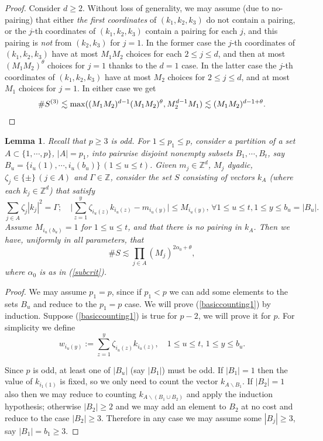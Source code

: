 \documentclass[11 pt,reqno]{amsart}
\newtheorem{lem}[thm]{Lemma}
\theoremstyle{definition}
\theoremstyle{remark}
\numberwithin{equation}{section}
\newcommand{\Zb}{\mathbb{Z}}
\begin{document}
{\begin{proof}
Consider $d\geq 2$. Without loss of generality, we may assume (due to no-pairing) that either \emph{the first coordinates} of $(k_1,k_2,k_3)$ do not contain a pairing, or the $j$-th coordinates of $(k_1,k_2,k_3)$ contain a pairing for each $j$, and this pairing is \emph{not} from $(k_2,k_3)$ for $j=1$. In the former case the $j$-th coordinates of $(k_1,k_2,k_3)$ have at most $M_1M_2$ choices for each $2\leq j\leq d$, and then at most $(M_1M_2)^\theta$ choices for $j=1$ thanks to the $d=1$ case. In the latter case the $j$-th coordinates of $(k_1,k_2,k_3)$ have at most $M_2$ choices for $2\leq j\leq d$, and at most $M_1$ choices for $j=1$. In either case we get
\[\#S^{(3)}\lesssim\max((M_1M_2)^{d-1}(M_1M_2)^\theta,M_2^{d-1}M_1)\lesssim (M_1M_2)^{d-1+\theta}.\qedhere\]
 \end{proof}
 \begin{lem}\label{basic} Recall that $p\geq 3$ is odd. For $1\leq p_1\leq p$, consider a partition of a set $A\subset\{1,\cdots,p\}$, $|A|=p_1$, into pairwise disjoint nonempty subsets $B_1,\cdots,B_t$, say $B_u=\{i_u(1),\cdots,i_u(b_u)\}\,(1\leq u\leq t)$. Given $m_j\in\Zb^d$, $M_j$ dyadic, $\zeta_j\in\{\pm\}\,(j\in A)$ and $\Gamma\in\Zb$, consider the set $S$ consisting of vectors $k_A$ (where each $k_j\in\Zb^d$) that satisfy
 \begin{equation}\label{basicset}\sum_{j\in A}\zeta_j|k_j|^2=\Gamma;\quad \bigg|\sum_{z=1}^y\zeta_{i_u(z)}k_{i_u(z)}-m_{i_u(y)}\bigg|\leq M_{i_u(y)},\,\forall 1\leq u\leq t,1\leq y\leq b_u=|B_u|.
 \end{equation}
Assume $M_{i_{u}(b_u)}=1$ for $1\leq u\leq t$, and that there is no pairing in $k_A$. Then we have, uniformly in all parameters, that
 \begin{equation}\label{basiccounting1}\#S\lesssim \prod_{j\in A}(M_j)^{2\alpha_0+\theta},
 \end{equation} where $\alpha_0$ is as in (\ref{subcrit}).
 \end{lem}
 \begin{proof} We may assume $p_1=p$, since if $p_1<p$ we can add some elements to the sets $B_u$ and reduce to the $p_1=p$ case. We will prove (\ref{basiccounting1}) by induction. Suppose (\ref{basiccounting1}) is true for $p-2$, we will prove it for $p$. For simplicity we define
 \[w_{i_u(y)}:=\sum_{z=1}^y\zeta_{i_u(z)}k_{i_u(z)},\quad 1\leq u\leq t,\,1\leq y\leq b_u.\]
 
 Since $p$ is odd, at least one of $|B_u|$ (say $|B_1|$) must be odd. If $|B_1|=1$ then the value of $k_{i_1(1)}$ is fixed, so we only need to count the vector $k_{A\backslash B_1}$. If $|B_2|=1$ also then we may reduce to counting $k_{A\backslash (B_1\cup B_2)}$ and apply the induction hypothesis; otherwise $|B_2|\geq 2$ and we may add an element to $B_2$ at no cost and reduce to the case $|B_2|\geq 3$. Therefore in any case we may assume some $|B_j|\geq 3$, say $|B_1|=b_1\geq 3$.
 

\end{proof}}
\end{document}
